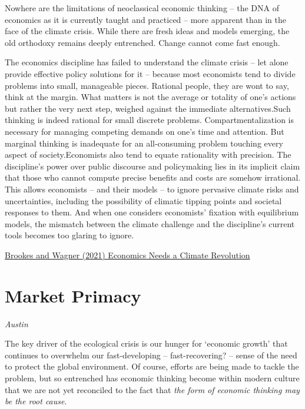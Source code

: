 \documentclass[
]{book}
\begin{document}
Nowhere are the limitations of neoclassical economic thinking -- the DNA of economics as it is currently taught and practiced -- more apparent than in the face of the climate crisis. While there are fresh ideas and models emerging, the old orthodoxy remains deeply entrenched. Change cannot come fast enough.

The economics discipline has failed to understand the climate crisis -- let alone provide effective policy solutions for it -- because most economists tend to divide problems into small, manageable pieces. Rational people, they are wont to say, think at the margin. What matters is not the average or totality of one's actions but rather the very next step, weighed against the immediate alternatives.Such thinking is indeed rational for small discrete problems. Compartmentalization is necessary for managing competing demands on one's time and attention. But marginal thinking is inadequate for an all-consuming problem touching every aspect of society.Economists also tend to equate rationality with precision. The discipline's power over public discourse and policymaking lies in its implicit claim that those who cannot compute precise benefits and costs are somehow irrational. This allows economists -- and their models -- to ignore pervasive climate risks and uncertainties, including the possibility of climatic tipping points and societal responses to them. And when one considers economists' fixation with equilibrium models, the mismatch between the climate challenge and the discipline's current tools becomes too glaring to ignore.

\href{https://www.project-syndicate.org/commentary/neoclassical-economics-fails-with-climate-change-by-tom-brookes-and-gernot-wagner-2021-06}{Brookes and Wagner (2021) Economics Needs a Climate Revolution}

\hypertarget{market-primacy}{%
\section{Market Primacy}\label{market-primacy}}

\emph{Austin}

The key driver of the ecological crisis is our hunger for `economic growth' that continues to overwhelm our fast-developing -- fast-recovering? -- sense of the need to protect the global environment. Of course, efforts are being made to tackle the problem, but so entrenched has economic thinking become within modern culture that we are not yet reconciled to the fact that \emph{the form of economic thinking may be the root cause}.
\end{document}
